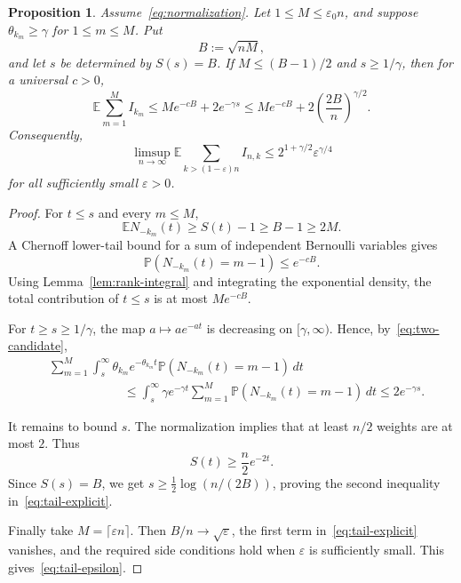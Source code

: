 \documentclass[11pt]{article}
\newtheorem{proposition}[theorem]{Proposition}
\theoremstyle{remark}
\theoremstyle{plain}
\newcommand{\E}{\mathbb E}
\newcommand{\Pp}{\mathbb P}
\newcommand{\eps}{\varepsilon}
\begin{document}
\begin{proposition}\label{prop:endpoint-bound}
Assume~\eqref{eq:normalization}.  Let $1\le M\le\eps_0n$, and suppose
$\theta_{k_m}\ge\gamma$ for $1\le m\le M$.  Put
\begin{equation}\label{eq:B-definition}
 B:=\sqrt{nM},
\end{equation}
and let $s$ be determined by $S(s)=B$.  If $M\le(B-1)/2$ and $s\ge1/\gamma$,
then for a universal $c>0$,
\begin{equation}\label{eq:tail-explicit}
 \E\sum_{m=1}^M I_{k_m}
 \le M e^{-cB}+2e^{-\gamma s}
 \le M e^{-cB}+2\left(\frac{2B}{n}\right)^{\gamma/2}.
\end{equation}
Consequently,
\begin{equation}\label{eq:tail-epsilon}
 \limsup_{n\to\infty}
 \E\sum_{k>(1-\eps)n}I_{n,k}
 \le 2^{1+\gamma/2}\eps^{\gamma/4}
\end{equation}
for all sufficiently small $\eps>0$.
\end{proposition}

\begin{proof}
For $t\le s$ and every $m\le M$,
\[
 \E N_{-k_m}(t)\ge S(t)-1\ge B-1\ge2M.
\]
A Chernoff lower-tail bound for a sum of independent Bernoulli variables gives
\[
 \Pp(N_{-k_m}(t)=m-1)\le e^{-cB}.
\]
Using Lemma~\ref{lem:rank-integral} and integrating the exponential density,
the total contribution of $t\le s$ is at most $Me^{-cB}$.

For $t\ge s\ge1/\gamma$, the map $a\mapsto ae^{-at}$ is decreasing on
$[\gamma,\infty)$.  Hence, by~\eqref{eq:two-candidate},
\begin{align*}
 &\sum_{m=1}^M\int_s^\infty
 \theta_{k_m}e^{-\theta_{k_m}t}
 \Pp(N_{-k_m}(t)=m-1)\,dt\\
 &\hspace{1in}\le
 \int_s^\infty\gamma e^{-\gamma t}
 \sum_{m=1}^M\Pp(N_{-k_m}(t)=m-1)\,dt
 \le2e^{-\gamma s}.
\end{align*}

It remains to bound $s$.  The normalization implies that at least $n/2$
weights are at most $2$.  Thus
\[
 S(t)\ge\frac n2e^{-2t}.
\]
Since $S(s)=B$, we get $s\ge\frac12\log(n/(2B))$, proving the second
inequality in~\eqref{eq:tail-explicit}.

Finally take $M=\lceil\eps n\rceil$.  Then $B/n\to\sqrt\eps$, the first
term in~\eqref{eq:tail-explicit} vanishes, and the required side conditions
hold when $\eps$ is sufficiently small.  This gives~\eqref{eq:tail-epsilon}.
\end{proof}
\end{document}
